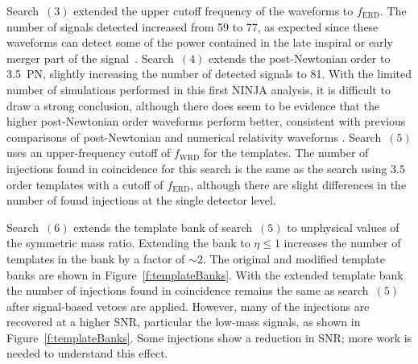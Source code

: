 Search~$(3)$ extended the upper cutoff frequency of the waveforms to
$f_\mathrm{ERD}$. The number of signals detected increased from 59 to 77, as
expected since these waveforms can detect some of the power contained in the
late inspiral or early merger part of the
signal~\cite{Pan:2007nw,Boyle:2009dg}. Search~$(4)$ extends the post-Newtonian
order to 3.5~PN, slightly increasing the number of detected signals to 81.
With the limited number of simulations performed in this first NINJA analysis,
it is difficult to draw a strong conclusion, although there does seem to be
evidence that the higher post-Newtonian order waveforms perform better,
consistent with previous comparisons of post-Newtonian and numerical
relativity waveforms
\cite{Pan:2007nw,Baker:2006ha,Hannam:2007ik,Boyle:2008ge,Boyle:2009dg}.
Search~$(5)$ uses an upper-frequency cutoff of $f_\mathrm{WRD}$ for the
templates. The number of injections found in coincidence for this search is
the same as the search using $3.5$ order templates with a cutoff of
$f_\mathrm{ERD}$, although there are slight differences in the number of found
injections at the single detector level.

Search~$(6)$ extends the template bank of search~$(5)$ to unphysical values of
the symmetric mass ratio. Extending the bank to $\eta\le 1$ increases the
number of templates in the bank by a factor of $\sim 2$. The original and
modified template banks are shown in Figure~\ref{f:templateBanks}. With the
extended template bank the number of injections found in coincidence remains
the same as search~$(5)$ after signal-based vetoes are applied.  However, many
of the injections are recovered at a higher SNR, particular the low-mass
signals, as shown in Figure~\ref{f:templateBanks}.  Some injections show a
reduction in SNR; more work is needed to understand this effect.

